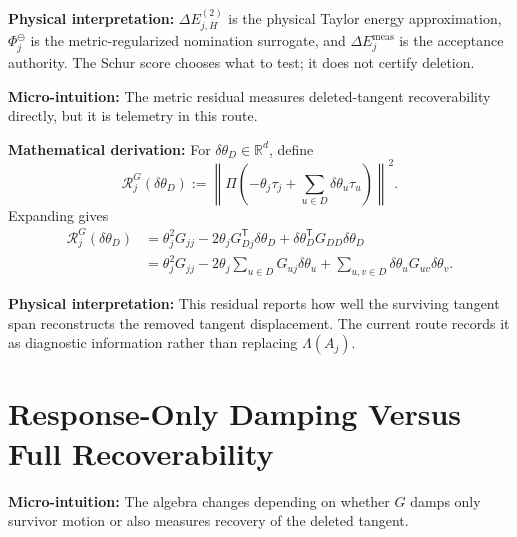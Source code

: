 \documentclass[10pt,twocolumn]{article}
\newcommand{\blocktitle}[1]{\vspace{2pt}\noindent\textbf{#1}\space}
\newcommand{\micro}[1]{\blocktitle{Micro-intuition:} #1}
\newcommand{\deriv}{\blocktitle{Mathematical derivation:}}
\newcommand{\phys}[1]{\blocktitle{Physical interpretation:} #1}
\begin{document}
\phys{\(\Delta E_{j,H}^{(2)}\) is the physical Taylor energy approximation, \(\Phi_j^\ominus\) is the metric-regularized nomination surrogate, and \(\Delta E_j^{\mathrm{meas}}\) is the acceptance authority. The Schur score chooses what to test; it does not certify deletion.}

\micro{The metric residual measures deleted-tangent recoverability directly, but it is telemetry in this route.}

\deriv
For \(\delta\theta_D\in\mathbb R^d\), define
\[
\mathcal R_j^G(\delta\theta_D)
:=
\left\|
\Pi\left(
-\theta_j\tau_j+\sum_{u\in D}\delta\theta_u\tau_u
\right)
\right\|^2.
\]
Expanding gives
\[
\begin{aligned}
\mathcal R_j^G(\delta\theta_D)
&=
\theta_j^2G_{jj}
-2\theta_jG_{Dj}^{\mathsf T}\delta\theta_D
+\delta\theta_D^{\mathsf T}G_{DD}\delta\theta_D
\\
&=
\theta_j^2G_{jj}
-2\theta_j\sum_{u\in D}G_{uj}\delta\theta_u
+\sum_{u,v\in D}\delta\theta_uG_{uv}\delta\theta_v.
\end{aligned}
\]

\phys{This residual reports how well the surviving tangent span reconstructs the removed tangent displacement. The current route records it as diagnostic information rather than replacing \(\Lambda(A_j)\).}

\section*{Response-Only Damping Versus Full Recoverability}

\micro{The algebra changes depending on whether \(G\) damps only survivor motion or also measures recovery of the deleted tangent.}
\end{document}
